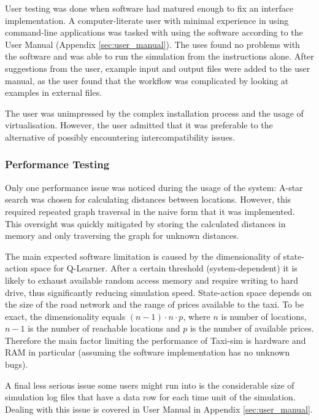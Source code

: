 User testing was done when software had matured enough to fix an interface
implementation. A computer-literate user with minimal experience in using
command-line applications was tasked with using the software according to the
User Manual (Appendix \ref{sec:user_manual}). The uses found no problems with
the software and was able to run the simulation from the instructions alone.
After suggestions from the user, example input and output files were added to
the user manual, as the user found that the workflow was complicated by looking
at examples in external files.

The user was unimpressed by the complex installation process and the usage of
virtualisation. However, the user admitted that it was preferable to the
alternative of possibly encountering intercompatibility issues.

\subsubsection{Performance Testing}

Only one performance issue was noticed during the usage of the system: A-star
search was chosen for calculating distances between locations. However, this
required repeated graph traversal in the naive form that it was implemented.
This oversight was quickly mitigated by storing the calculated distances in
memory and only traversing the graph for unknown distances.

The main expected software limitation is caused by the dimensionality of state-
action space for Q-Learner. After a certain threshold (system-dependent) it is
likely to exhaust available random access memory and require writing to hard
drive, thus significantly reducing simulation speed. State-action space depends
on the size of the road network and the range of prices available to the taxi.
To be exact, the dimensionality equals \( (n-1) \cdot n \cdot p\), where \(n\)
is number of locations, \(n-1\) is the number of reachable locations and \(p\)
is the number of available prices. Therefore the main factor limiting the
performance of Taxi-sim is hardware and RAM in particular (assuming the
software implementation has no unknown bugs).

A final less serious issue some users might run into is the considerable
size of simulation log files that have a data row for each time unit of the
simulation. Dealing with this issue is covered in User Manual in Appendix \ref{sec:user_manual}.
